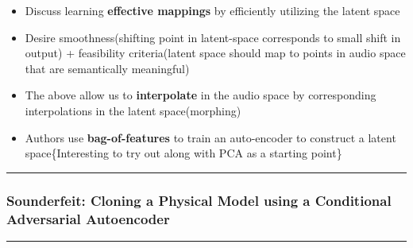 \documentclass[11pt]{article}
\providecommand{\tightlist}{%
      \setlength{\itemsep}{0pt}\setlength{\parskip}{0pt}}
\begin{document}
    \begin{itemize}
\tightlist
\item
  Discuss learning \textbf{effective mappings} by efficiently utilizing
  the latent space
\item
  Desire smoothness(shifting point in latent-space corresponds to small
  shift in output) + feasibility criteria(latent space should map to
  points in audio space that are semantically meaningful)
\item
  The above allow us to \textbf{interpolate} in the audio space by
  corresponding interpolations in the latent space(morphing)
\item
  Authors use \textbf{bag-of-features} to train an auto-encoder to
  construct a latent space\{Interesting to try out along with PCA as a
  starting point\}
\end{itemize}

    \begin{center}\rule{0.5\linewidth}{\linethickness}\end{center}

\subsubsection{Sounderfeit: Cloning a Physical Model using a Conditional
Adversarial
Autoencoder}\label{sounderfeit-cloning-a-physical-model-using-a-conditional-adversarial-autoencoder}

\begin{center}\rule{0.5\linewidth}{\linethickness}\end{center}
\end{document}
